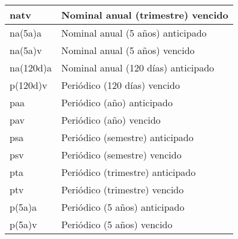 \begin{spacing}{1}
\begin{center}
\begin{tabular}{ |p{2.5cm}|p{9.5cm}|}
			natv                      & Nominal anual (trimestre) vencido                                                   \\ \hline
			
			na(5a)a                   & Nominal anual (5 años) anticipado                                                   \\ \hline
			
			na(5a)v                   & Nominal anual (5 años) vencido                                                      \\ \hline
			
			na(120d)a                 & Nominal anual (120 días) anticipado                                                 \\ \hline
			
			p(120d)v                  & Periódico (120 días) vencido                                                        \\ \hline
			
			paa                       & Periódico (año)  anticipado                                                         \\ \hline
			
			pav                       & Periódico (año) vencido                                                             \\ \hline
			
			psa                       & Periódico (semestre) anticipado                                                     \\\hline
			
			psv                       & Periódico (semestre) vencido                                                        \\\hline
			
			pta                       & Periódico (trimestre) anticipado                                                    \\ \hline
			
			ptv                       & Periódico (trimestre) vencido                                                       \\ \hline
			
			p(5a)a                    & Periódico (5 años) anticipado                                                       \\ \hline
			
			p(5a)v                    & Periódico (5 años) vencido                                                          \\ \hline
			

\end{tabular}
\end{center}
\end{spacing}
